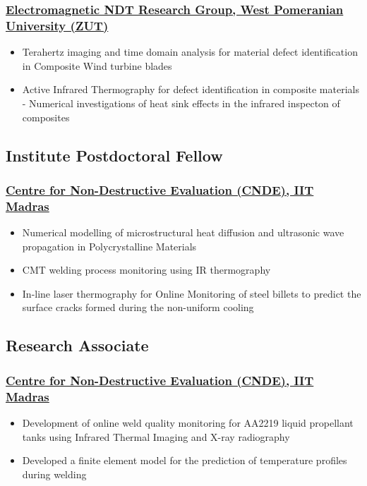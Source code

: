 \documentclass{my_cv}%
\begin{document}
\subsubsection{\href{https://innowacje.zut.edu.pl/cooperationoffer/electromagnetic-methods-non-destructive-testing}{Electromagnetic NDT Research Group, West Pomeranian University (ZUT)}}
\begin{itemize}[leftmargin=0.15in]
\setlength\itemsep{-0.1em}
\color{mygray}
\item Terahertz imaging and time domain analysis for material defect identification in Composite Wind turbine blades
\item Active Infrared Thermography for defect identification in composite materials - Numerical investigations of heat sink effects in the infrared inspecton of composites
\end{itemize}
{\color{mygray1} \hdashrule[0.1ex]{18.8cm}{0.2mm}{1mm}}
\subsection{Institute Postdoctoral Fellow}
\subsubsection{\href{https://www.cnde.in/}{Centre for Non-Destructive Evaluation (CNDE), IIT Madras}}
\begin{itemize}[leftmargin=0.15in]
\setlength\itemsep{-0.1em}
\color{mygray}
\item Numerical modelling of microstructural heat diffusion and ultrasonic wave propagation in Polycrystalline Materials
\item CMT welding process monitoring using IR thermography 
\item In-line laser thermography for Online Monitoring of steel billets to predict the surface cracks formed during the non-uniform cooling
\end{itemize}
{\color{mygray1} \hdashrule[0.1ex]{18.8cm}{0.2mm}{1mm}}
\subsection{Research Associate}
\subsubsection{\href{https://www.cnde.in/}{Centre for Non-Destructive Evaluation (CNDE), IIT Madras}}
\begin{itemize}[leftmargin=0.15in]
\setlength\itemsep{-0.1em}
\color{mygray}
\item Development of online weld quality monitoring for AA2219 liquid propellant tanks using Infrared Thermal Imaging and X-ray radiography
\item Developed a finite element model for the prediction of temperature profiles during welding
\end{itemize}
\end{document}
